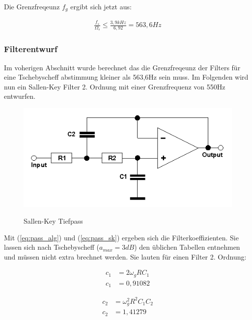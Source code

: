 \documentclass[11pt,twoside,openright]{mpreport}
\begin{document}
Die Grenzfreqeunz $f_g$ ergibt sich jetzt aus:

\begin{align}
\frac{f_s}{\Omega_s} \le \frac{3,9kHz}{6,92} = 563,6Hz
\end{align}


\subsubsection{Filterentwurf}
Im voherigen Abschnitt wurde berechnet das die Grenzfreqeunz der Filters für eine Tschebyscheff abstimmung kleiner als 563,6Hz sein muss.
Im Folgenden wird nun ein Sallen-Key Filter 2. Ordnung mit einer Grenzfrequenz von 550Hz entwurfen.

\begin{figure}[H]
\centering
\includegraphics[scale=0.8]{tiefpass_sk.png}\\
\caption{Sallen-Key Tiefpass}%
\label{fig:tiefpass_sk}
\end{figure}

Mit (\ref{eq:pass_alg}) und (\ref{eq:pass_sk}) ergeben sich die Filterkoeffizienten. 
Sie lassen sich nach Tschebyscheff ($a_{max}=3dB$) den üblichen Tabellen
entnehmen und müssen nicht extra brechnet werden. Sie lauten für einen Filter 2. Ordnung:

\begin{minipage}{0.5\textwidth}
\begin{align*}
c_1 &= 2\omega_g R C_1\\
c_1 &= 0,91082
\end{align*}
\end{minipage}
\begin{minipage}{0.5\textwidth}
\begin{align*}
c_2&=\omega_g^2 R^2 C_1 C_2\\
c_2&= 1,41279
\end{align*}
\end{minipage}
\\
\end{document}
